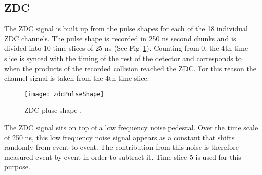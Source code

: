     \subsection{ZDC \DIFdelbegin {}\DIFdelend \DIFaddbegin {}\DIFaddend }
      The ZDC signal is built up from the pulse shapes for each of the 
        18 individual ZDC channels. 
      The pulse shape is recorded in 250 ns second chunks and is divided into
        10 time slices of 25 ns (See Fig~\ref{fig:zdcPulseShape}).
      Counting from 0, the 4th time slice is synced with the timing of the rest
        of the detector and corresponds to when the products of the recorded 
        collision reached the ZDC.
      For this reason the channel signal is taken from the 4th time slice.
      \begin{figure}[h]
        \centering
        \texttt{[image: zdcPulseShape]}
        \caption{\DIFaddbeginFL {}\DIFaddendFL ZDC pluse shape \DIFaddbeginFL {}\DIFaddendFL .}
        \label{fig:zdcPulseShape}
      \end{figure}

      The ZDC signal sits on top of a low frequency noise pedestal. 
      Over the time scale of 250 ns, this low frequency noise signal appears
        as a constant that shifts randomly from event to event.
      The contribution from this noise is therefore measured event by event
        in order to subtract it.
      Time slice 5 is used for this purpose.

